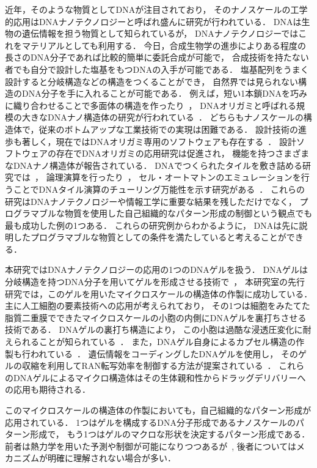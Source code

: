 近年，そのような物質としてDNAが注目されており，
そのナノスケールの工学的応用はDNAナノテクノロジーと呼ばれ盛んに研究が行われている．
DNAは生物の遺伝情報を担う物質として知られているが，
DNAナノテクノロジーではこれをマテリアルとしても利用する．
今日，合成生物学の進歩によりある程度の長さのDNA分子であれば比較的簡単に委託合成が可能で，
合成技術を持たない者でも自分で設計した塩基をもつDNAの入手が可能である．
塩基配列をうまく設計すると分岐構造などの構造をつくることができ，
自然界では見られない構造のDNA分子を手に入れることが可能である．
例えば，短い1本鎖DNAを巧みに織り合わせることで多面体の構造を作ったり~\cite{chen1991synthesis}，
DNAオリガミと呼ばれる規模の大きなDNAナノ構造体の研究が行われている~\cite{rothemund2006folding}．
どちらもナノスケールの構造体で，従来のボトムアップな工業技術での実現は困難である．
設計技術の進歩も著しく，現在ではDNAオリガミ専用のソフトウェアも存在する~\cite{douglas2009rapid}．
設計ソフトウェアの存在でDNAオリガミの応用研究は促進され，
機能を持つさまざまなDNAナノ構造体が報告されている．
DNAでつくられたタイルを敷き詰める研究では~\cite{winfree1998design}，
論理演算を行ったり~\cite{mao2000logical}，
セル・オートマトンのエミュレーションを行うことでDNAタイル演算のチューリング万能性を示す研究がある~\cite{rothemund2004algorithmic}．
これらの研究はDNAナノテクノロジーや情報工学に重要な結果を残しただけでなく，
プログラマブルな物質を使用した自己組織的なパターン形成の制御という観点でも最も成功した例の1つある．
これらの研究例からわかるように，
DNAは先に説明したプログラマブルな物質としての条件を満たしていると考えることができる．


本研究ではDNAナノテクノロジーの応用の1つのDNAゲルを扱う．
DNAゲルは分岐構造を持つDNA分子を用いてゲルを形成させる技術で~\cite{um2006enzyme}，
本研究室の先行研究では，このゲルを用いたマイクロスケールの構造体の作製に成功している．
主に人工細胞の要素技術への応用が考えられており，
その1つは細胞をみたてた脂質二重膜でできたマイクロスケールの小胞の内側にDNAゲルを裏打ちさせる技術である．
DNAゲルの裏打ち構造により，
この小胞は過酷な浸透圧変化に耐えられることが知られている~\cite{kurokawa2017dna}．
また，DNAゲル自身によるカプセル構造の作製も行われている~\cite{morita2017formation}．
遺伝情報をコーディングしたDNAゲルを使用し，
そのゲルの収縮を利用してRAN転写効率を制御する方法が提案されている~\cite{watanabe}．
これらのDNAゲルによるマイクロ構造体はその生体親和性からドラッグデリバリーへの応用も期待される．

このマイクロスケールの構造体の作製においても，自己組織的なパターン形成が応用されている．
1つはゲルを構成するDNA分子形成であるナノスケールのパターン形成で，
もう1つはゲルのマクロな形状を決定するパターン形成である．
前者は熱力学を用いた予測や制御が可能になりつつあるが~\cite{zadeh2011nupack}, 
後者についてはメカニズムが明確に理解されない場合が多い．


